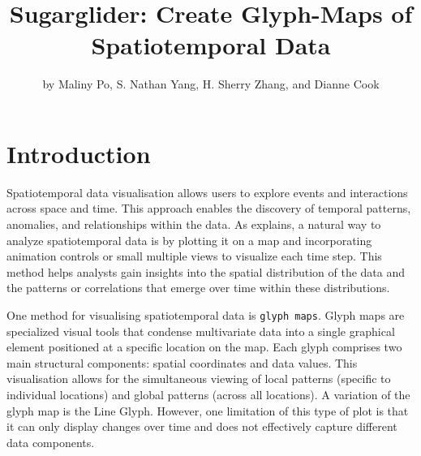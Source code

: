 \title{Sugarglider: Create Glyph-Maps of Spatiotemporal Data}


\author{by Maliny Po, S. Nathan Yang, H. Sherry Zhang, and Dianne Cook}

\maketitle


\section{Introduction}\label{introduction}

Spatiotemporal data visualisation allows users to explore events and interactions across space and time. This approach enables the discovery of temporal patterns, anomalies, and relationships within the data. As \citet{kim2017data} explains, a natural way to analyze spatiotemporal data is by plotting it on a map and incorporating animation controls or small multiple views to visualize each time step. This method helps analysts gain insights into the spatial distribution of the data and the patterns or correlations that emerge over time within these distributions.

One method for visualising spatiotemporal data is \texttt{glyph\ maps}. Glyph maps are specialized visual tools that condense multivariate data into a single graphical element positioned at a specific location on the map. Each glyph comprises two main structural components: spatial coordinates and data values. This visualisation allows for the simultaneous viewing of local patterns (specific to individual locations) and global patterns (across all locations). A variation of the glyph map is the Line Glyph. However, one limitation of this type of plot is that it can only display changes over time and does not effectively capture different data components.

